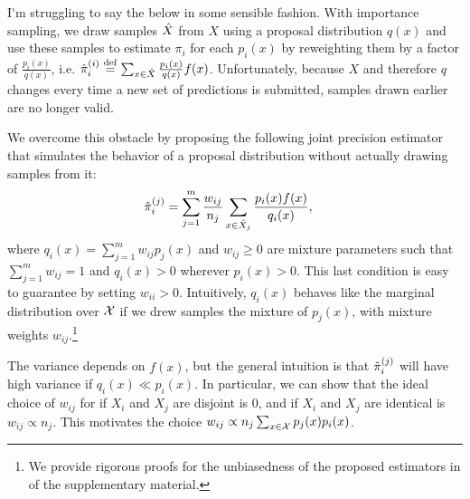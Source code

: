 \ac{I'm struggling to say the below in some sensible fashion.}
With importance sampling, we draw samples ${\hat{X}}$ from $X$ using a proposal distribution $q(x)$ and use these samples to estimate $\pi_i$ for each $p_i(x)$ by reweighting them by a factor of $\frac{p_i(x)}{q(x)}$, i.e. ${\hat{\pi}}_i^{(i)} \stackrel{\rm def}{=} \sum_{x \in {\hat{X}}} \frac{p_i(x)}{q(x)} f(x)$.
Unfortunately, because $X$ and therefore $q$ changes every time a new set of predictions is submitted, samples drawn earlier are no longer valid.

We overcome this obstacle by proposing the following joint precision estimator that simulates the behavior of a proposal distribution without actually drawing samples from it:
\begin{align}
  {\hat{\pi}}_i^{(j)} &= \sum_{j=1}^m \frac{w_{ij}}{n_{j}} \sum_{x \in {\hat{X}}_j} \frac{p_i(x) f(x)}{q_i(x)},
\end{align}
where $q_i(x) = \sum_{j=1}^m w_{ij} p_j(x)$ and $w_{ij} \ge 0$ are mixture parameters such that $\sum_{j=1}^m w_{ij} = 1$ and $q_i(x) > 0$ wherever $p_i(x) > 0$.
This last condition is easy to guarantee by setting $w_{ii} > 0$.
Intuitively, $q_i(x)$ behaves like the marginal distribution over $\mathcal{X}$ if we drew samples the mixture of $p_j(x)$, with mixture weights $w_{ij}$.\footnote{%
We provide rigorous proofs for the unbiasedness of the proposed estimators in  of the supplementary material.}

The variance depends on $f(x)$, but the general intuition is that ${\hat{\pi}}_i^{(j)}$ will have high variance if $q_i(x) \ll p_i(x)$.
In particular, we can show that the ideal choice of $w_{ij}$ for if $X_i$ and $X_j$ are disjoint is $0$, and if $X_i$ and $X_j$ are identical is $w_{ij} \propto n_{j}$.
This motivates the choice $w_{ij} \propto n_{j} \sum_{x \in \mathcal{X}} p_j(x) p_i(x)$.

